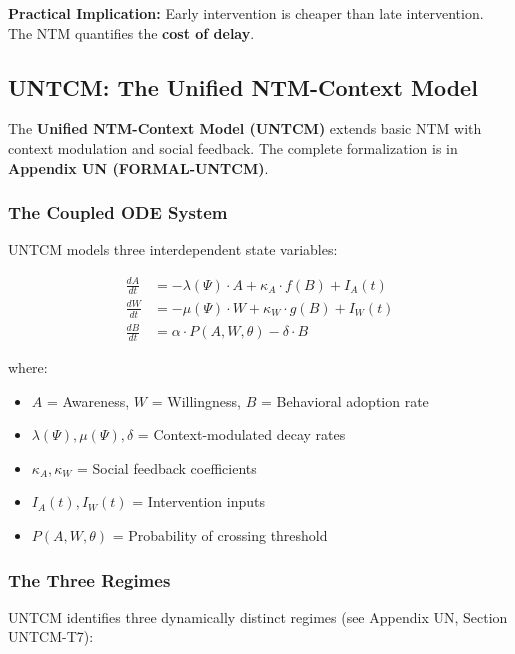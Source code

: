 \textbf{Practical Implication:} Early intervention is cheaper than late intervention. The NTM quantifies the \textbf{cost of delay}.

\subsection{UNTCM: The Unified NTM-Context Model}
\label{sec:ch16-untcm}

The \textbf{Unified NTM-Context Model (UNTCM)} extends basic NTM with context modulation and social feedback. The complete formalization is in \textbf{Appendix UN (FORMAL-UNTCM)}.

\subsubsection{The Coupled ODE System}

UNTCM models three interdependent state variables:

\begin{align}
\frac{dA}{dt} &= -\lambda(\Psi) \cdot A + \kappa_A \cdot f(B) + I_A(t) \label{eq:untcm-A} \\
\frac{dW}{dt} &= -\mu(\Psi) \cdot W + \kappa_W \cdot g(B) + I_W(t) \label{eq:untcm-W} \\
\frac{dB}{dt} &= \alpha \cdot P(A, W, \theta) - \delta \cdot B \label{eq:untcm-B}
\end{align}

where:
\begin{itemize}[nosep]
\item $A$ = Awareness, $W$ = Willingness, $B$ = Behavioral adoption rate
\item $\lambda(\Psi), \mu(\Psi), \delta$ = Context-modulated decay rates
\item $\kappa_A, \kappa_W$ = Social feedback coefficients
\item $I_A(t), I_W(t)$ = Intervention inputs
\item $P(A, W, \theta)$ = Probability of crossing threshold
\end{itemize}

\subsubsection{The Three Regimes}

UNTCM identifies three dynamically distinct regimes (see Appendix UN, Section UNTCM-T7):

